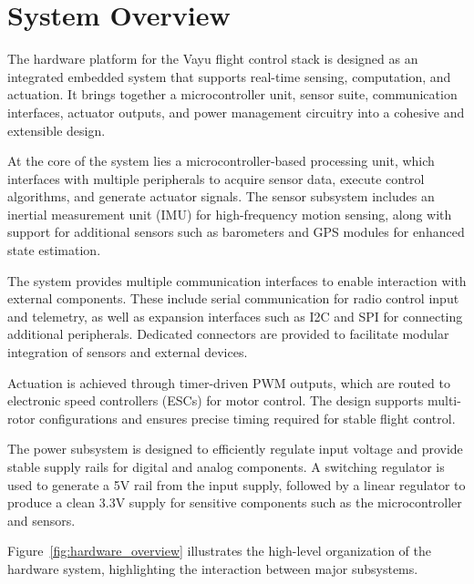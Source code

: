 \section{System Overview}
\label{sec:hw_overview}

The hardware platform for the Vayu flight control stack is designed as an integrated embedded system that supports real-time sensing, computation, and actuation. It brings together a microcontroller unit, sensor suite, communication interfaces, actuator outputs, and power management circuitry into a cohesive and extensible design.

At the core of the system lies a microcontroller-based processing unit, which interfaces with multiple peripherals to acquire sensor data, execute control algorithms, and generate actuator signals. The sensor subsystem includes an inertial measurement unit (IMU) for high-frequency motion sensing, along with support for additional sensors such as barometers and GPS modules for enhanced state estimation.

The system provides multiple communication interfaces to enable interaction with external components. These include serial communication for radio control input and telemetry, as well as expansion interfaces such as I2C and SPI for connecting additional peripherals. Dedicated connectors are provided to facilitate modular integration of sensors and external devices.

Actuation is achieved through timer-driven PWM outputs, which are routed to electronic speed controllers (ESCs) for motor control. The design supports multi-rotor configurations and ensures precise timing required for stable flight control.

The power subsystem is designed to efficiently regulate input voltage and provide stable supply rails for digital and analog components. A switching regulator is used to generate a 5V rail from the input supply, followed by a linear regulator to produce a clean 3.3V supply for sensitive components such as the microcontroller and sensors.

Figure~\ref{fig:hardware_overview} illustrates the high-level organization of the hardware system, highlighting the interaction between major subsystems.

